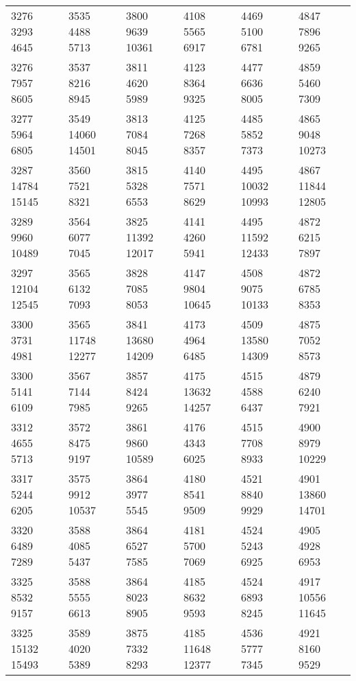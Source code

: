 \begin{center}
\begin{longtable}{llllll}
3276 3293 4645&3535 4488 5713&3800 9639 10361&4108 5565 6917&4469 5100 6781&4847 7896 9265\\
3276 7957 8605&3537 8216 8945&3811 4620 5989&4123 8364 9325&4477 6636 8005&4859 5460 7309\\
3277 5964 6805&3549 14060 14501&3813 7084 8045&4125 7268 8357&4485 5852 7373&4865 9048 10273\\
3287 14784 15145&3560 7521 8321&3815 5328 6553&4140 7571 8629&4495 10032 10993&4867 11844 12805\\
3289 9960 10489&3564 6077 7045&3825 11392 12017&4141 4260 5941&4495 11592 12433&4872 6215 7897\\
3297 12104 12545&3565 6132 7093&3828 7085 8053&4147 9804 10645&4508 9075 10133&4872 6785 8353\\
3300 3731 4981&3565 11748 12277&3841 13680 14209&4173 4964 6485&4509 13580 14309&4875 7052 8573\\
3300 5141 6109&3567 7144 7985&3857 8424 9265&4175 13632 14257&4515 4588 6437&4879 6240 7921\\
3312 4655 5713&3572 8475 9197&3861 9860 10589&4176 4343 6025&4515 7708 8933&4900 8979 10229\\
3317 5244 6205&3575 9912 10537&3864 3977 5545&4180 8541 9509&4521 8840 9929&4901 13860 14701\\
3320 6489 7289&3588 4085 5437&3864 6527 7585&4181 5700 7069&4524 5243 6925&4905 4928 6953\\
3325 8532 9157&3588 5555 6613&3864 8023 8905&4185 8632 9593&4524 6893 8245&4917 10556 11645\\
3325 15132 15493&3589 4020 5389&3875 7332 8293&4185 11648 12377&4536 5777 7345&4921 8160 9529\\
\end{longtable}
\end{center}
\clearpage
